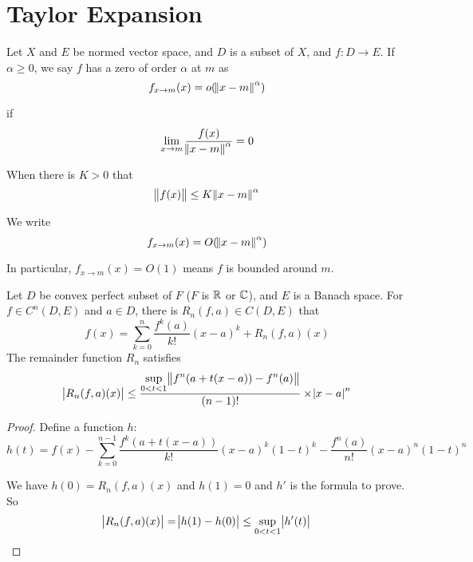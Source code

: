 \section{Taylor Expansion}

\begin{definition}
    Let $X$ and $E$ be normed vector space, and $D$ is a subset of $X$, and $f: D\rightarrow E$. If $\alpha \geq 0$, we say $f$ has a zero of order $\alpha$ at $m$ as 
    \begin{equation}
        f_{x \rightarrow m} (x) = o(\norm{x-m}^\alpha)
    \end{equation}
    
    if 
    \begin{equation}
        \lim_{x \rightarrow m} \frac{f(x)}{\norm{x - m}^\alpha} = 0
    \end{equation}
    
    When there is $K > 0$ that
    \begin{equation}
        \norm{f(x)} \leq K \norm{x - m}^\alpha
    \end{equation}
    
    We write 
    \begin{equation}
        f_{x \rightarrow m} (x) = O(\norm{x-m}^\alpha)
    \end{equation}
    
    In particular, $f_{x \rightarrow m}(x) = O(1)$ means $f$ is bounded around $m$.
\end{definition}



\begin{theorem}
    Let $D$ be convex perfect subset of $F$ ($F$ is $\mathbb{R}$ or $\mathbb{C}$), and $E$ is a Banach space. For $f \in C^n (D, E)$ and $a \in D$, there is $R_n(f,a) \in C(D,E)$ that
    \begin{equation}
        f(x) = \sum_{k=0}^n \frac{f^k (a)}{k!}(x-a)^k + R_n(f,a)(x)
    \end{equation}
    The remainder function $R_n$ satisfies
    \begin{equation}
        \abs{R_n(f,a)(x)} \leq \frac{\displaystyle \sup_{0 < t < 1}\norm{f^n (a + t(x-a)) - f^n (a)} }{(n-1)!}  \times \abs{x-a}^n
    \end{equation}
\end{theorem}
\begin{proof}
    Define a function $h$:
    \begin{equation}
        h(t) = f(x) - \sum_{k=0}^{n-1}\frac{f^k (a + t(x-a))}{k!} (x-a)^k (1-t)^k - \frac{f^n(a)}{n!}(x-a)^n (1-t)^n
    \end{equation}
    
    We have $h(0) = R_n(f,a)(x)$ and $h(1)=0$ and $h'$ is the formula to prove. So
    \begin{equation}
        \abs{R_n(f,a)(x)} = \abs{h(1) - h(0)} \leq \sup_{0 < t < 1} \abs{h'(t)}
    \end{equation}
\end{proof}

